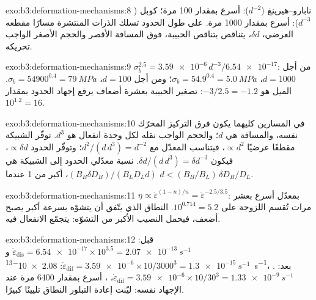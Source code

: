\begin{solution}{exo:b3:deformation-mechanisms:8}
نابارو--هيرينغ ($d^{-2}$): أسرع بمقدار 100 مرة؛ كوبل ($d^{-3}$): أسرع بمقدار 1000 مرة.
على طول الحدود تسلك الذرات المنتشرة مسارًا مقطعه العرضي، $\delta
d$، يتناقص بتناقص الحبيبة، فوق المسافة الأقصر والحجم الأصغر
الواجب تحريكه.
\end{solution}

\begin{solution}{exo:b3:deformation-mechanisms:9}
$\sigma_b^{2.5} = \num{3.59e-6}\,d^{-3}/\num{6.54e-17}$: من أجل $d = 1000$،
$\sigma_b = 54.9^{0.4} = \qty{5.0}{MPa}$؛ ومن أجل $d = 100$، $\sigma_b =
\num{54900}^{0.4} = \qty{79}{MPa}$. الميل هو $-3/2.5 = -1.2$: تصغير الحبيبة
بعشرة أضعاف يرفع إجهاد الحدود بمقدار $10^{1.2} = 16$.
\end{solution}

\begin{solution}{exo:b3:deformation-mechanisms:10}
في المسارين كليهما يكون فرق التركيز المحرّك نفسه،
والمسافة هي $d$؛ والحجم الواجب نقله لكل وحدة انفعال هو $d^3$. توفّر الشبيكة
مقطعًا عرضيًا $\propto d^2$، فيتناسب المعدّل مع $d^2/(d\,d^3) =
d^{-2}$؛ وتوفّر الحدود $\propto\delta d$، فيكون $\delta d/(d\,d^3) = \delta
d^{-3}$. نسبة معدّلي الحدود إلى الشبيكة هي $(B_B\delta D_B)/(B_LD_Ld)$،
أكبر من 1 عندما $d < (B_B/B_L)\,\delta D_B/D_L$.
\end{solution}

\begin{solution}{exo:b3:deformation-mechanisms:11}
$\eta \propto \dot\varepsilon^{(1-n)/n} = \dot\varepsilon^{-2.5/3.5}$: بمعدّل أسرع بعشر
مرات تُقسم اللزوجة على $10^{0.714} = 5.2$. النطاق الذي يتّفق أن
يتشوّه بسرعة أكبر يصبح أضعف، فيحمل النصيب الأكبر من التشوّه: يتجمّع
الانفعال فيه.
\end{solution}

\begin{solution}{exo:b3:deformation-mechanisms:12}
قبل: $\dot\varepsilon_{\mathrm{dis}} = \num{6.54e-17}\times10^{3.5} =
\qty{2.07e-13}{s^{-1}}$ و$\dot\varepsilon_{\mathrm{dif}} = \num{3.59e-6}
\times10/3000^3 = \qty{1.3e-15}{s^{-1}}$: \qty{2.08e-13}{s^{-1}}، . بعد: $\dot\varepsilon_{\mathrm{dif}} = \num{3.59e-6}\times10/30^3 =
\qty{1.33e-9}{s^{-1}}$، ، أسرع بمقدار \num{6400} مرة عند
الإجهاد نفسه: ليّنت إعادة التبلور النطاق تليينًا كبيرًا.
\end{solution}

